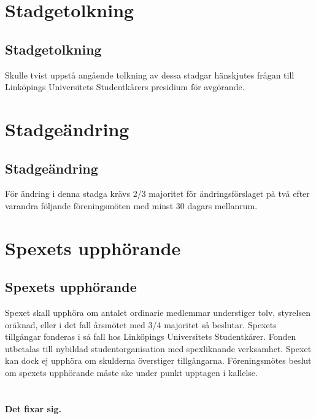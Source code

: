 \documentclass[a4paper]{article}
\begin{document}
\section{Stadgetolkning}
\subsection{Stadgetolkning}
Skulle tvist uppstå angående tolkning av dessa stadgar hänskjutes frågan till Linköpings Universitets Studentkårers presidium för avgörande.

\section{Stadgeändring}
\subsection{Stadgeändring}
För ändring i denna stadga krävs 2/3 majoritet för ändringsförslaget på två efter varandra följande föreningsmöten med minst 30 dagars mellanrum.

\section{Spexets upphörande}
\subsection{Spexets upphörande}
Spexet skall upphöra om antalet ordinarie medlemmar understiger tolv, styrelsen oräknad, eller i det fall årsmötet med 3/4 majoritet så beslutar. Spexets tillgångar fonderas i så fall hos Linköpings Universitets Studentkårer. Fonden utbetalas till nybildad studentorganisation med spexliknande verksamhet. Spexet kan dock ej upphöra om skulderna överstiger tillgångarna. Föreningsmötes beslut om spexets upphörande måste ske under punkt upptagen i kallelse.

\setcounter{section}{16}
\section{ }
\textbf{Det fixar sig.}
\end{document}
